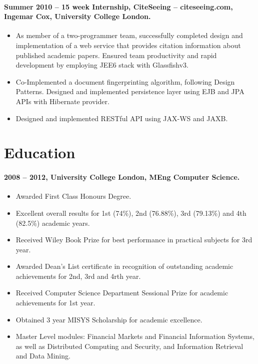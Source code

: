 \documentclass[11pt, a4paper]{article}
\newlength{\wideitemsep}
\let\olditem\item
\renewcommand{\item}{\setlength{\itemsep}{\wideitemsep}\olditem}
\begin{document}
\paragraph{Summer 2010 – 15 week Internship, CiteSeeing – citeseeing.com, Ingemar Cox, University College London.}
\begin{itemize}
\item As member of a two-programmer team, successfully completed design and implementation of a web service that provides citation information about published academic papers. Ensured team productivity and rapid development by employing JEE6 stack with Glassfishv3.
\item Co-Implemented a document fingerprinting algorithm, following Design Patterns. Designed and implemented persistence layer using EJB and JPA APIs with Hibernate provider.
\item Designed and implemented RESTful API using JAX-WS and JAXB.
\end{itemize}

\section*{Education}
\paragraph{2008 – 2012, University College London, MEng Computer Science.}
\begin{itemize}
\item Awarded First Class Honours Degree.
\item Excellent overall results for 1st (74\%), 2nd (76.88\%), 3rd (79.13\%) and 4th (82.5\%) academic years.
\item Received Wiley Book Prize for best performance in practical subjects for 3rd year.
\item Awarded Dean's List certificate in recognition of outstanding academic achievements for 2nd, 3rd and 4rth year.
\item Received Computer Science Department Sessional Prize for academic achievements for 1st year.
\item Obtained 3 year MISYS Scholarship for academic excellence.
\item Master Level modules: Financial Markets and Financial Information Systems, as well as Distributed Computing and Security, and Information Retrieval and Data Mining.
\end{itemize}
\end{document}
